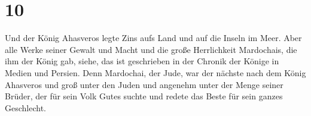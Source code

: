 \hypertarget{section-9}{%
\section{10}\label{section-9}}

 Und der König Ahasveros legte Zins aufs Land und auf die
Inseln im Meer.  Aber alle Werke seiner Gewalt und Macht
und die große Herrlichkeit Mardochais, die ihm der König gab, siehe, das
ist geschrieben in der Chronik der Könige in Medien und Persien.
 Denn Mardochai, der Jude, war der nächste nach dem König
Ahasveros und groß unter den Juden und angenehm unter der Menge seiner
Brüder, der für sein Volk Gutes suchte und redete das Beste für sein
ganzes Geschlecht.
